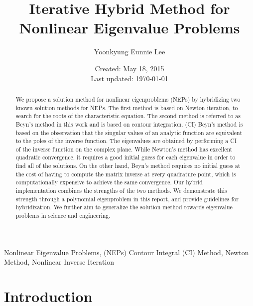 \documentclass[11pt,letterpaper]{article}
\title{Iterative Hybrid Method for Nonlinear Eigenvalue Problems}
\author{Yoonkyung Eunnie Lee}
\date{Created: May 18, 2015 \\Last updated: \today}
\begin{document}
\pagestyle{myheadings}

\maketitle
\begin{abstract}
We propose a solution method for nonlinear eigenproblems (NEPs) by hybridizing two known solution methods for NEPs. The first method is based on Newton iteration, to search for the roots of the characteristic equation. The second method is referred to as Beyn's method in this work and is based on contour integration. (CI) Beyn's method is based on the observation that the singular values of an analytic function are equivalent to the poles of the inverse function. The eigenvalues are obtained by performing a CI of the inverse function on the complex plane.  
While Newton's method has excellent quadratic convergence, it requires a good initial guess for each eigenvalue in order to find all of the solutions. On the other hand, Beyn's method requires no initial guess at the cost of having to compute the matrix inverse at every quadrature point, which is computationally expensive to achieve the same convergence. Our hybrid implementation combines the strengths of the two methods. We demonstrate this strength through a polynomial eigenproblem in this report, and provide guidelines for hybridization. We further aim to generalize the solution method towards eigenvalue problems in science and engineering. 
\end{abstract}
Nonlinear Eigenvalue Problems, (NEPs) Contour Integral (CI) Method, Newton Method, Nonlinear Inverse Iteration
\section{Introduction} 
\end{document}
